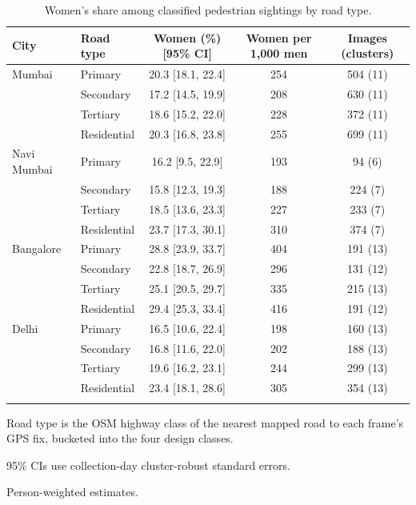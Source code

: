 \begin{table}[t]
\centering
\caption{Women's share among classified pedestrian sightings by road type.}
\label{tab:road_type}
\scriptsize
\begin{threeparttable}
\begin{tabular}{@{\extracolsep{0pt}}llccc}
\toprule
City & Road type & Women (\%) [95\% CI] & Women per 1,000 men & Images (clusters) \\
\midrule
Mumbai & Primary & 20.3 [18.1, 22.4] & 254 & 504 (11) \\
 & Secondary & 17.2 [14.5, 19.9] & 208 & 630 (11) \\
 & Tertiary & 18.6 [15.2, 22.0] & 228 & 372 (11) \\
 & Residential & 20.3 [16.8, 23.8] & 255 & 699 (11) \\
\addlinespace
Navi Mumbai & Primary & 16.2 [9.5, 22.9] & 193 & 94 (6) \\
 & Secondary & 15.8 [12.3, 19.3] & 188 & 224 (7) \\
 & Tertiary & 18.5 [13.6, 23.3] & 227 & 233 (7) \\
 & Residential & 23.7 [17.3, 30.1] & 310 & 374 (7) \\
\addlinespace
Bangalore & Primary & 28.8 [23.9, 33.7] & 404 & 191 (13) \\
 & Secondary & 22.8 [18.7, 26.9] & 296 & 131 (12) \\
 & Tertiary & 25.1 [20.5, 29.7] & 335 & 215 (13) \\
 & Residential & 29.4 [25.3, 33.4] & 416 & 191 (12) \\
\addlinespace
Delhi & Primary & 16.5 [10.6, 22.4] & 198 & 160 (13) \\
 & Secondary & 16.8 [11.6, 22.0] & 202 & 188 (13) \\
 & Tertiary & 19.6 [16.2, 23.1] & 244 & 299 (13) \\
 & Residential & 23.4 [18.1, 28.6] & 305 & 354 (13) \\
\addlinespace
\bottomrule
\end{tabular}
\begin{tablenotes}[flushleft]
\item Road type is the OSM highway class of the nearest mapped road to each frame's GPS fix, bucketed into the four design classes.
\item 95\% CIs use collection-day cluster-robust standard errors.
\item Person-weighted estimates.
\end{tablenotes}
\end{threeparttable}
\end{table}
